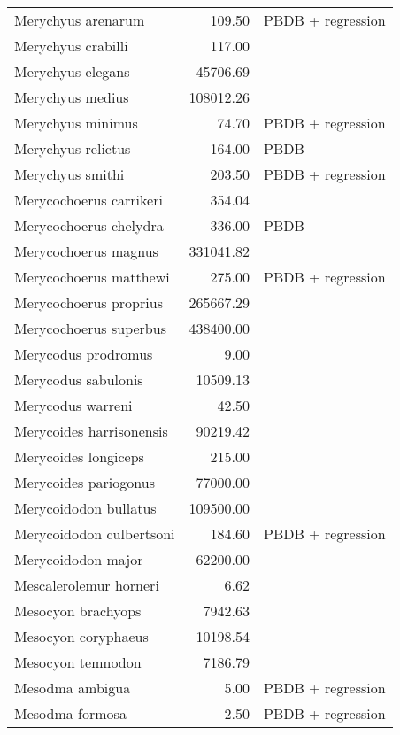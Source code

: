 \begin{table}[ht]
\begin{tabular}{lrl}
  Merychyus arenarum & 109.50 & PBDB + regression \\ 
  Merychyus crabilli & 117.00 & \cite{Johansen1996} \\ 
  Merychyus elegans & 45706.69 & \cite{Tomiya2013} \\ 
  Merychyus medius & 108012.26 & \cite{Tomiya2013} \\ 
  Merychyus minimus & 74.70 & PBDB + regression \\ 
  Merychyus relictus & 164.00 & PBDB \\ 
  Merychyus smithi & 203.50 & PBDB + regression \\ 
  Merycochoerus carrikeri & 354.04 & \cite{Rose2011a} \\ 
  Merycochoerus chelydra & 336.00 & PBDB \\ 
  Merycochoerus magnus & 331041.82 & \cite{Tomiya2013} \\ 
  Merycochoerus matthewi & 275.00 & PBDB + regression \\ 
  Merycochoerus proprius & 265667.29 & \cite{Tomiya2013} \\ 
  Merycochoerus superbus & 438400.00 & \cite{McKenna2011} \\ 
  Merycodus prodromus & 9.00 & \cite{Kelly1954} \\ 
  Merycodus sabulonis & 10509.13 & \cite{Tomiya2013} \\ 
  Merycodus warreni & 42.50 & \cite{Baskin2004} \\ 
  Merycoides harrisonensis & 90219.42 & \cite{Tomiya2013} \\ 
  Merycoides longiceps & 215.00 & \cite{Stock1948} \\ 
  Merycoides pariogonus & 77000.00 & \cite{McKenna2011} \\ 
  Merycoidodon bullatus & 109500.00 & \cite{McKenna2011} \\ 
  Merycoidodon culbertsoni & 184.60 & PBDB + regression \\ 
  Merycoidodon major & 62200.00 & \cite{McKenna2011} \\ 
  Mescalerolemur horneri & 6.62 & \cite{MacIntyre1966} \\ 
  Mesocyon brachyops & 7942.63 & \cite{Tomiya2013} \\ 
  Mesocyon coryphaeus & 10198.54 & \cite{Tomiya2013} \\ 
  Mesocyon temnodon & 7186.79 & \cite{Tomiya2013} \\ 
  Mesodma ambigua & 5.00 & PBDB + regression \\ 
  Mesodma formosa & 2.50 & PBDB + regression \\ 

\end{tabular}
\end{table}
